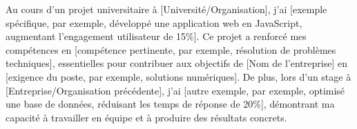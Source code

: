 

Au cours d’un projet universitaire à [Université/Organisation], j’ai [exemple spécifique, par exemple, développé une application web en JavaScript, augmentant l’engagement utilisateur de 15\%]. Ce projet a renforcé mes compétences en [compétence pertinente, par exemple, résolution de problèmes techniques], essentielles pour contribuer aux objectifs de [Nom de l'entreprise] en [exigence du poste, par exemple, solutions numériques]. De plus, lors d’un stage à [Entreprise/Organisation précédente], j’ai [autre exemple, par exemple, optimisé une base de données, réduisant les temps de réponse de 20\%], démontrant ma capacité à travailler en équipe et à produire des résultats concrets.
